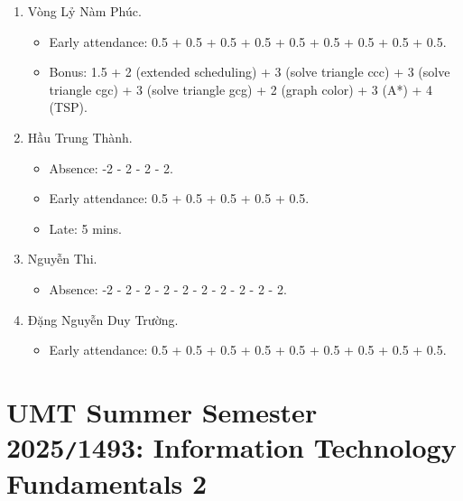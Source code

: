 \documentclass{article}
\begin{document}
\begin{enumerate}
	\begin{itemize}
		\item Absence: -2 - 1 - 2  + 0.5.
		\item Early attendance: 0.5 + 0.5 + 0.5 + 0.5 + 0.5.
	\end{itemize}
	\item {\sc Vòng Lỷ Nàm Phúc.}
	\begin{itemize}
		\item Early attendance: 0.5 + 0.5 + 0.5 + 0.5 + 0.5 + 0.5 + 0.5 + 0.5 + 0.5.
		\item Bonus: 1.5 + 2 (extended scheduling) + 3 (solve triangle ccc) + 3 (solve triangle cgc) + 3 (solve triangle gcg) + 2 (graph color) + 3 (A*) + 4 (TSP).
	\end{itemize}
	\item {\sc Hầu Trung Thành.}
	\begin{itemize}
		\item Absence: -2 - 2 - 2 - 2.
		\item Early attendance: 0.5 + 0.5 + 0.5 + 0.5 + 0.5.
		\item Late: 5 mins.
	\end{itemize}
	\item {\sc Nguyễn Thi.}
	\begin{itemize}
		\item Absence: -2 - 2 - 2 - 2 - 2 - 2 - 2 - 2 - 2 - 2.
	\end{itemize}
	\item {\sc Đặng Nguyễn Duy Trường.}
	\begin{itemize}
		\item Early attendance: 0.5 + 0.5 + 0.5 + 0.5 + 0.5 + 0.5 + 0.5 + 0.5 + 0.5.
	\end{itemize}
\end{enumerate}


\section{UMT Summer Semester 2025{\tt/}1493: Information Technology Fundamentals 2}
\end{document}
